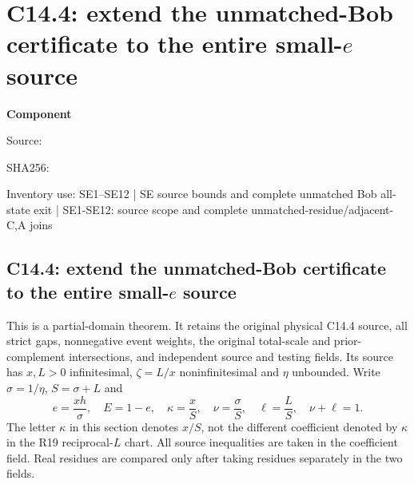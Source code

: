 \chapter{C14.4: extend the unmatched-Bob certificate to the entire small-$e$ source}
\label{component:p8c30238a5f7d}
\noindent\textbf{Component }\par
{\small\noindent Source: \par}
{\small\noindent SHA256: \par}
{\small\noindent Inventory use: SE1--SE12 | SE source bounds and complete unmatched Bob all-state exit | SE1-SE12: source scope and complete unmatched-residue/adjacent-C,A joins\par}
\medskip
\section{C14.4: extend the unmatched-Bob certificate to the entire small-$e$ source}
\label{p8c30238a5f7d:sec:recovery-c144-small-e}

This is a partial-domain theorem. It retains the original physical C14.4
source, all strict gaps, nonnegative event weights, the original total-scale
and prior-complement intersections, and independent source and testing fields.
Its source has $x,L>0$ infinitesimal, $\zeta=L/x$ noninfinitesimal and
$\eta$ unbounded. Write $\sigma=1/\eta$, $S=\sigma+L$ and
\[
 e=\frac{xh}{\sigma},\quad E=1-e,\quad
 \kappa=\frac{x}{S},\quad \nu=\frac{\sigma}{S},\quad
 \ell=\frac{L}{S},\quad \nu+\ell=1.
 \tag{SE1}
\]
The letter $\kappa$ in this section denotes $x/S$, not the different
coefficient denoted by $\kappa$ in the R19 reciprocal-$L$ chart.
All source inequalities are taken in the coefficient field. Real residues
are compared only after taking residues separately in the two fields.

